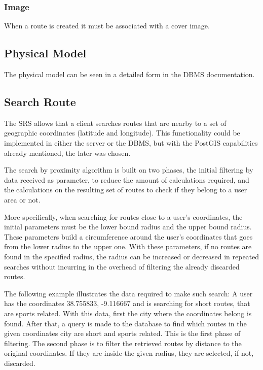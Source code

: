         \subsubsection*{Image}
        When a route is created it must be associated with a cover image. 

    \subsection*{Physical Model}
    The physical model can be seen in a detailed form in the DBMS documentation.\cite{servicedbms}

    \subsection*{Search Route}
    The SRS allows that a client searches routes that are nearby to a set of geographic coordinates (latitude and longitude). 
    This functionality could be implemented in either the server or the DBMS, but with the PostGIS capabilities already mentioned, the later was chosen.
    
    The search by proximity algorithm is built on two phases, the initial filtering by data received as parameter, to reduce the amount of 
    calculations required, and the calculations on the resulting set of routes to check if they belong to a user area or not.
    
    More specifically, when searching for routes close to a user's coordinates, the initial parameters must be the lower bound radius
    and the upper bound radius. These parameters build a circumference around the user's coordinates that goes from the lower radius to the 
    upper one. With these parameters, if no routes are found in the specified radius, the radius can be increased or decreased in repeated
    searches without incurring in the overhead of filtering the already discarded routes. 

    The following example illustrates the data required to make such search:
    A user has the coordinates 38.755833, -9.116667 and is searching for short routes, that are sports related.
    With this data, first the city where the coordinates belong is found. After that, a query is made to the database
    to find which routes in the given coordinates city are short and sports related. This is the first phase of filtering.
    The second phase is to filter the retrieved routes by distance to the original coordinates. If they are inside the 
    given radius, they are selected, if not, discarded.

